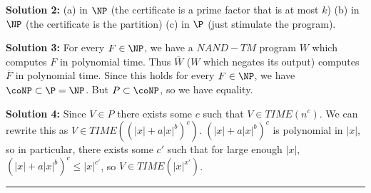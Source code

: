\documentclass[10pt]{article}
\newcommand{\Line}{\vspace{.3cm}\hrule\vspace{.3cm}}
\begin{document}
\textbf{Solution 2:} (a) in $\NP$ (the certificate is a prime factor that is at most $k$) (b) in $\NP$ (the certificate is the partition) (c) in $\P$ (just stimulate the program).

\par

\textbf{Solution 3:} For every $F \in \NP$, we have a $NAND-TM$ program $W$  which computes $F$ in polynomial time. Thus $\overline{W}$ ($W$ which negates its output) computes $\overline{F}$ in polynomial time. Since this holds for every $F \in \NP$, we have $\coNP \subset \P = \NP$. But $P \subset \coNP$, so we have equality.

\textbf{Solution 4:} Since $V\in P$ there exists some $c$ such that $V\in TIME(n^c)$. We can rewrite this as $V\in TIME((|x| + a|x|^b)^c)$. $(|x| + a|x|^b)^c$ is polynomial in $|x|$, so in particular, there exists some $c'$ such that for large enough $|x|$, $(|x| + a|x|^b)^c \leq |x|^{c'}$, so $V\in TIME(|x|^{x'})$.

\Line
\end{document}
